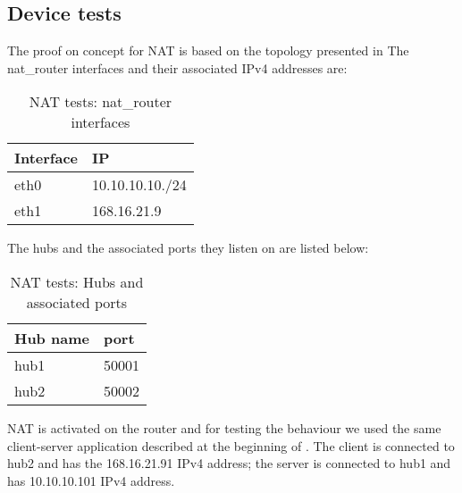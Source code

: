{{\subsection{Device tests}
\label{sub-sec:nat-tests}
The proof on concept for NAT is based on the topology presented in 
The nat_router interfaces and their associated IPv4 addresses are:
\begin{center}
  \begin{table}[htb]
  \begin{center}
  \begin{tabular}{| l | l | }
    \hline
      Interface & IP \\ \hline
      eth0 & 10.10.10.10./24 \\ \hline
      eth1 & 168.16.21.9\\
    \hline
  \end{tabular}
  \end{center}
  \caption{NAT tests: nat_router interfaces}
  \label{table:nat-top}
  \end{table}
\end{center}
The hubs and the associated ports they listen on are listed below:
\begin{center}
  \begin{table}[htb]
  \begin{center}
  \begin{tabular}{| l | l | }
    \hline
      Hub name & port \\ \hline
      hub1 & 50001 \\ \hline
      hub2 & 50002\\ 
    \hline
  \end{tabular}
  \end{center}
  \caption{NAT tests: Hubs and associated ports}
  \label{table:nat-hubs}
  \end{table}
\end{center}

NAT is activated on the router and for testing the behaviour we used the same client-server application described 
at the beginning of . The client is connected to hub2 and has the 168.16.21.91 IPv4 
address; the server is connected to hub1 and has 10.10.10.101 IPv4 address.

}}
